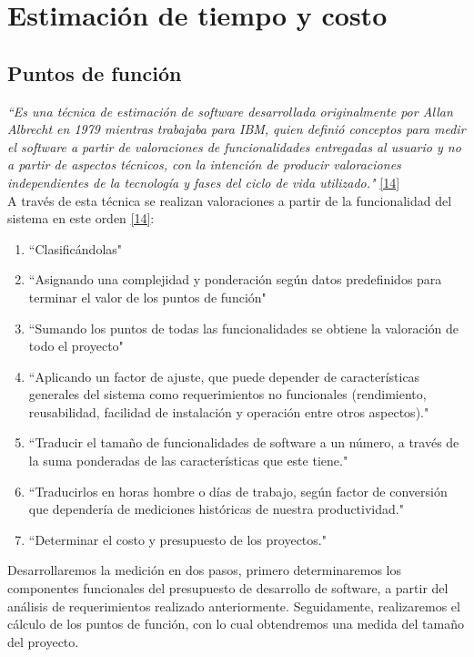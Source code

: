 

\chapter{Estimación de tiempo y costo} \label{cap:cinco}

\section{Puntos de función}

\textit{``Es una técnica de estimación de software desarrollada originalmente por Allan Albrecht en 1979 mientras trabajaba para IBM, quien definió conceptos para medir el software a partir de valoraciones de funcionalidades entregadas al usuario y no a partir de aspectos técnicos, con la intención de producir valoraciones independientes de la tecnología y fases del ciclo de vida utilizado."} \hyperlink{b14}{[14]}\\

A través de esta técnica se realizan valoraciones a partir de la funcionalidad del sistema en este orden \hyperlink{b14}{[14]}:

\begin{enumerate}
	\item ``Clasificándolas"
	\item ``Asignando una complejidad y ponderación según datos predefinidos para terminar el valor de los puntos de función"
	\item ``Sumando los puntos de todas las funcionalidades se obtiene la valoración de todo el proyecto"
	\item ``Aplicando un factor de ajuste, que puede depender de características generales del sistema como requerimientos no funcionales (rendimiento, reusabilidad, facilidad de instalación y operación entre otros aspectos)."
	\item ``Traducir el tamaño de funcionalidades de software a un número, a través de la suma ponderadas de las características que este tiene."
	\item ``Traducirlos en horas hombre o días de trabajo, según factor de conversión que dependería de mediciones históricas de nuestra productividad."
	\item ``Determinar el costo y presupuesto de los proyectos."
\end{enumerate}

Desarrollaremos la medición en dos pasos, primero determinaremos los componentes funcionales del presupuesto de desarrollo de software, a partir del análisis de requerimientos realizado anteriormente. Seguidamente, realizaremos el cálculo de los puntos de función, con lo cual obtendremos una medida del tamaño del proyecto.\\

